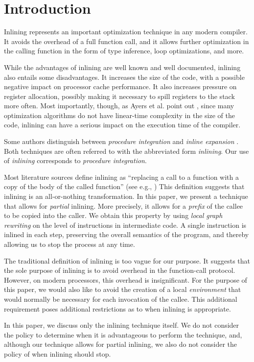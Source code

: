 \section{Introduction}

Inlining represents an important optimization technique in any modern
compiler.  It avoids the overhead of a full function call, and it
allows further optimization in the calling function in the form of
type inference, loop optimizations, and more.

While the advantages of inlining are well known and well documented,
inlining also entails some disadvantages.  It increases the size of
the code, with a possible negative impact on processor cache
performance.  It also increases pressure on register allocation,
possibly making it necessary to spill registers to the stack more
often.  Most importantly, though, as Ayers et al. point out
\cite{Ayers:1997:AI:258915.258928, Ayers:1997:AI:258916.258928}, since
many optimization algorithms do not have linear-time complexity in the
size of the code, inlining can have a serious impact on the execution
time of the compiler.

Some authors distinguish between \emph{procedure integration} and
\emph{inline expansion} \cite{Muchnick:1998:ACD:286076}.  Both
techniques are often referred to with the abbreviated form
\emph{inlining}.  Our use of \emph{inlining} corresponds to
\emph{procedure integration}.

Most literature sources define inlining as
``replacing a call to a function with a copy of the body of the called
function'' (see e.g.,
\cite{Chang:1989:IFE:74818.74840,Chang:1989:IFE:73141.74840,
  Scheifler:1977:AIS:359810.359830}) This definition suggests that
inlining is an all-or-nothing transformation.  In this paper, we
present a technique that allows for \emph{partial} inlining.  More
precisely, it allows for a \emph{prefix} of the callee to be copied
into the caller.  We obtain this property by using \emph{local graph
  rewriting} on the level of instructions in intermediate code.  A
single instruction is inlined in each step, preserving the overall
semantics of the program, and thereby allowing us to stop the process
at any time.

The traditional definition of inlining is too vague for our
purpose.  It suggests that the sole purpose of inlining is to avoid
overhead in the function-call protocol.  However, on modern
processors, this overhead is insignificant.  For the purpose of this
paper, we would also like to avoid the creation of a local
\emph{environment} that would normally be necessary for each
invocation of the callee.  This additional requirement poses
additional restrictions as to when inlining is appropriate.

In this paper, we discuss only the inlining technique itself.  We do
not consider the policy to determine when it is advantageous to
perform the technique, and, although our technique allows for partial
inlining, we also do not consider the policy of when inlining should
stop.

